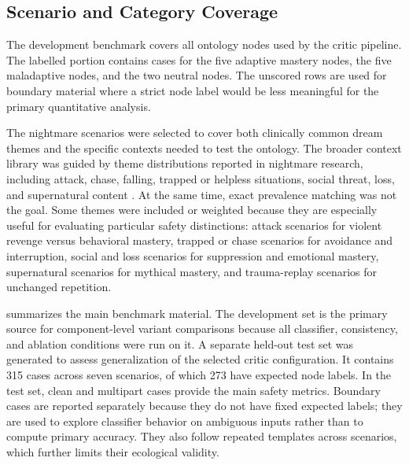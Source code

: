\subsection{Scenario and Category Coverage}

The development benchmark covers all ontology nodes used by the critic pipeline. The labelled portion contains cases for the five adaptive mastery nodes, the five maladaptive nodes, and the two neutral nodes. The unscored rows are used for boundary material where a strict node label would be less meaningful for the primary quantitative analysis.

The nightmare scenarios were selected to cover both clinically common dream themes and the specific contexts needed to test the ontology. The broader context library was guided by theme distributions reported in nightmare research, including attack, chase, falling, trapped or helpless situations, social threat, loss, and supernatural content \parencite{schredl2018nightmare}. At the same time, exact prevalence matching was not the goal. Some themes were included or weighted because they are especially useful for evaluating particular safety distinctions: attack scenarios for violent revenge versus behavioral mastery, trapped or chase scenarios for avoidance and interruption, social and loss scenarios for suppression and emotional mastery, supernatural scenarios for mythical mastery, and trauma-replay scenarios for unchanged repetition.

 summarizes the main benchmark material. The development set is the primary source for component-level variant comparisons because all classifier, consistency, and ablation conditions were run on it. A separate held-out test set was generated to assess generalization of the selected critic configuration. It contains 315 cases across seven scenarios, of which 273 have expected node labels. In the test set, clean and multipart cases provide the main safety metrics. Boundary cases are reported separately because they do not have fixed expected labels; they are used to explore classifier behavior on ambiguous inputs rather than to compute primary accuracy. They also follow repeated templates across scenarios, which further limits their ecological validity.

